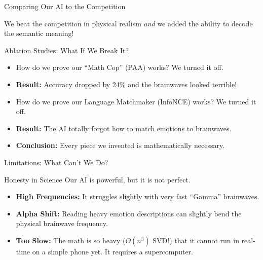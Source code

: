 \documentclass[11pt, aspectratio=169]{beamer}
\begin{document}
\begin{frame}{Comparing Our AI to the Competition}
    \begin{table}[]
        \centering
    \end{table}
    We beat the competition in physical realism \textit{and} we added the ability to decode the semantic meaning!
\end{frame}

\begin{frame}{Ablation Studies: What If We Break It?}
    \begin{itemize}
        \item How do we prove our ``Math Cop'' (PAA) works? We turned it off.
        \item \textbf{Result:} Accuracy dropped by 24\% and the brainwaves looked terrible!
        \item How do we prove our Language Matchmaker (InfoNCE) works? We turned it off.
        \item \textbf{Result:} The AI totally forgot how to match emotions to brainwaves.
        \item \textbf{Conclusion:} Every piece we invented is mathematically necessary.
    \end{itemize}
\end{frame}

\begin{frame}{Limitations: What Can't We Do?}
    \begin{alertblock}{Honesty in Science}
    Our AI is powerful, but it is not perfect.
    \end{alertblock}
    \begin{itemize}
        \item \textbf{High Frequencies:} It struggles slightly with very fast ``Gamma'' brainwaves.
        \item \textbf{Alpha Shift:} Reading heavy emotion descriptions can slightly bend the physical brainwave frequency.
        \item \textbf{Too Slow:} The math is so heavy ($O(n^3)$ SVD!) that it cannot run in real-time on a simple phone yet. It requires a supercomputer.
    \end{itemize}
\end{frame}
\end{document}
